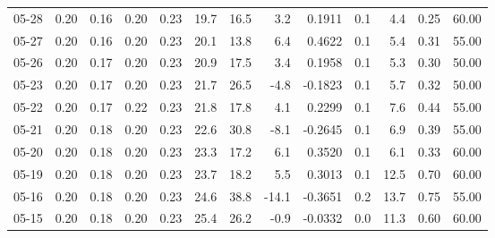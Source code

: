 \begin{threeparttable}
{\begin{tabular}{lrrrrrrrrrrrr}
  05-28 &          0.20 &          0.16 &          0.20 &        0.23 &                19.7 &                16.5 &        3.2 &       0.1911 &                 0.1 &              4.4 &            0.25 &                  60.00 \\
  05-27 &          0.20 &          0.16 &          0.20 &        0.23 &                20.1 &                13.8 &        6.4 &       0.4622 &                 0.1 &              5.4 &            0.31 &                  55.00 \\
  05-26 &          0.20 &          0.17 &          0.20 &        0.23 &                20.9 &                17.5 &        3.4 &       0.1958 &                 0.1 &              5.3 &            0.30 &                  50.00 \\
  05-23 &          0.20 &          0.17 &          0.20 &        0.23 &                21.7 &                26.5 &       -4.8 &      -0.1823 &                 0.1 &              5.7 &            0.32 &                  50.00 \\
  05-22 &          0.20 &          0.17 &          0.22 &        0.23 &                21.8 &                17.8 &        4.1 &       0.2299 &                 0.1 &              7.6 &            0.44 &                  55.00 \\
  05-21 &          0.20 &          0.18 &          0.20 &        0.23 &                22.6 &                30.8 &       -8.1 &      -0.2645 &                 0.1 &              6.9 &            0.39 &                  55.00 \\
  05-20 &          0.20 &          0.18 &          0.20 &        0.23 &                23.3 &                17.2 &        6.1 &       0.3520 &                 0.1 &              6.1 &            0.33 &                  60.00 \\
  05-19 &          0.20 &          0.18 &          0.20 &        0.23 &                23.7 &                18.2 &        5.5 &       0.3013 &                 0.1 &             12.5 &            0.70 &                  60.00 \\
  05-16 &          0.20 &          0.18 &          0.20 &        0.23 &                24.6 &                38.8 &      -14.1 &      -0.3651 &                 0.2 &             13.7 &            0.75 &                  55.00 \\
  05-15 &          0.20 &          0.18 &          0.20 &        0.23 &                25.4 &                26.2 &       -0.9 &      -0.0332 &                 0.0 &             11.3 &            0.60 &                  60.00 \\

\end{tabular}}
\end{threeparttable}
